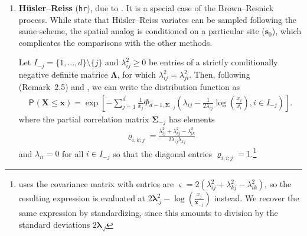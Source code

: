 \documentclass{article}\usepackage[]{graphicx}\usepackage[]{color}
\newcommand{\bs}[1]{\boldsymbol {#1}}
\renewcommand{\P}[2][]{{\mathsf P}_{#1}\left(#2\right)}
\newcommand{\code}[1]{\texttt{#1}}
\newcommand{\pfrac}[2]{\left(\frac{#1}{#2}\right)}
\begin{document}
\begin{enumerate}
\item \textbf{H\"usler--Reiss} (\code{hr}), due to \cite{Husler:1989}. It is a special case of the Brown--Resnick process.
While \cite{Engelke:2015} state that H\"usler--Reiss variates can be sampled following the same scheme, the spatial analog is
conditioned on a particular site ($\bs{s}_0$), which complicates the comparisons with the other methods.

Let $I_{-j}=\{1, \ldots, d\} \setminus \{j\}$ and $\lambda_{ij}^2 \geq 0$ be entries of a strictly conditionally
negative definite matrice $\bs{\Lambda}$, for which $\lambda_{ij}^2=\lambda_{ji}^2$. Then, following \cite{Nikoloulopoulos:2009}
(Remark~2.5) and \cite{Huser:2013}, we can write the distribution function as
 \begin{align*}
   \P{\bs{X} \leq \bs{x}} = \exp \left[ -\sum_{j=1}^d \frac{1}{x_j} \Phi_{d-1, \bs{\Sigma}_{-j}} \left( \lambda_{ij}-
\frac{1}{2\lambda_{ij}}  \log\pfrac{x_j}{x_i}, i \in I_{-j}\right)\right].
                  \end{align*}
                  where the partial correlation matrix $\bs{\Sigma}_{-j}$ has elements
                  \begin{align*}
                     \varrho_{i,k; j}= \frac{\lambda_{ij}^2+\lambda_{kj}^2-\lambda_{ik}^2}{2\lambda_{ij}\lambda_{kj}}
                  \end{align*}
and $\lambda_{ii}=0$ for all $i \in I_{-j}$ so that the diagonal entries $\varrho_{i,i; j}=1$.\footnote{\cite{Engelke:2015}
uses the covariance matrix with entries are $\varsigma=2(\lambda_{ij}^2+\lambda_{kj}^2-\lambda_{ik}^2)$, so the resulting
expression is evaluated at $2\bs{\lambda}_{.j}^2-\log\pfrac{x_j}{\bs{x}_{-j}}$ instead. We recover the same expression by
standardizing, since this amounts to division by the standard deviations $2\bs{\lambda}_{.j}$}




\end{enumerate}
\end{document}
